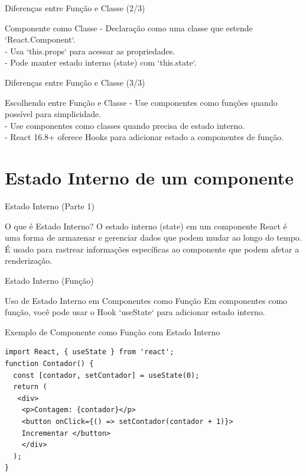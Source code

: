 \documentclass[13pt, xcolor={dvipsnames,svgnames}, portuguese]{beamer}
\begin{document}
\begin{frame}{Diferenças entre Função e Classe (2/3)}
  \begin{block}{Componente como Classe}
    - Declaração como uma classe que estende `React.Component`.\\
    - Usa `this.props` para acessar as propriedades.\\
    - Pode manter estado interno (state) com `this.state`.
  \end{block}
\end{frame}


\begin{frame}{Diferenças entre Função e Classe (3/3)}
  \begin{block}{Escolhendo entre Função e Classe}
    - Use componentes como funções quando possível para simplicidade.\\
    - Use componentes como classes quando precisa de estado interno.\\
    - React 16.8+ oferece Hooks para adicionar estado a componentes de função.
  \end{block}
\end{frame}


\section{Estado Interno de um componente}
\begin{frame}{Estado Interno (Parte 1)}
  \begin{block}{O que é Estado Interno?}
    O estado interno (state) em um componente React é uma forma de armazenar e gerenciar dados que podem mudar ao longo do tempo.\\ É usado para rastrear informações específicas ao componente que podem afetar a renderização.
  \end{block}
\end{frame}

\begin{frame}[fragile]{Estado Interno (Função)}
  \begin{block}{Uso de Estado Interno em Componentes como Função}
    Em componentes como função, você pode usar o Hook `useState` para adicionar estado interno.
  \end{block}
  
  \begin{exampleblock}{Exemplo de Componente como Função com Estado Interno}
    \begin{verbatim}
import React, { useState } from 'react';
function Contador() {
  const [contador, setContador] = useState(0);
  return (
   <div>
    <p>Contagem: {contador}</p>
    <button onClick={() => setContador(contador + 1)}>
    Incrementar </button>
    </div>
  );
}
    \end{verbatim}
  \end{exampleblock}
\end{frame}
\end{document}

